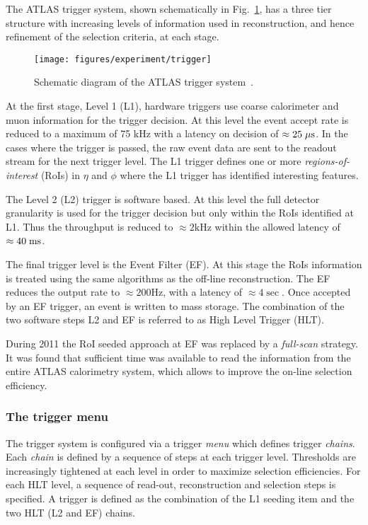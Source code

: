 The ATLAS trigger system, shown schematically in
Fig.~\ref{fig:trigger}, has a three tier structure with increasing
levels of information used in reconstruction, and hence refinement of
the selection criteria, at each stage.

\begin{figure}[ht]
\begin{center}
\texttt{[image: figures/experiment/trigger]}
\caption[ATLAS trigger system]{
  Schematic diagram of the ATLAS trigger system~\cite{trigger}. }
\label{fig:trigger}
\end{center}
\end{figure}

At the first stage, Level 1 (L1), hardware triggers use coarse
calorimeter and muon information for the trigger decision. At this
level the event accept rate is reduced to a maximum of 75 kHz with a
latency on decision of $\approx{}25\; \mu\mathrm{s}{}$. In the cases where the
trigger is passed, the raw event data are sent to the readout stream
for the next trigger level. The L1 trigger defines one or more
\emph{regions-of-interest} (RoIs) in $\eta{}$ and $\phi{}$ where the
L1 trigger has identified interesting features. 

The Level 2 (L2) trigger is software based. At this level the full detector
granularity is used for the trigger decision but only within the RoIs
identified at L1. Thus the throughput is reduced to
$\approx{}2\mathrm{kHz}$ within the allowed latency of $\approx{}40\; \mathrm{ms}{}$.

The final trigger level is the Event Filter (EF). At this stage the RoIs
information is treated using the same algorithms as the off-line
reconstruction. The EF reduces the output rate to $\approx{}200\mathrm{Hz}$, 
with a latency of $\approx{}4\sec{}$. Once accepted by an EF trigger, an
event is written to mass storage.
The combination of the two software steps L2 and EF is referred to 
as High Level Trigger (HLT).

During 2011 the RoI seeded approach at EF was replaced by a
{\it full-scan} strategy. It was found that sufficient time was available
to read the information from the entire ATLAS calorimetry system, 
which allows to improve the on-line selection efficiency.

\subsubsection{The trigger menu}

The trigger system is configured via a trigger \textit{menu} which
defines trigger \textit{chains}.
Each \textit{chain} is defined by a sequence of steps at each trigger level.
Thresholds are increasingly tightened at each level in order to
maximize selection efficiencies. 
For each HLT level, a sequence of read-out, reconstruction and
selection steps is specified. 
A trigger is defined as the combination of the L1 seeding item and the
two HLT (L2 and EF) chains. 

